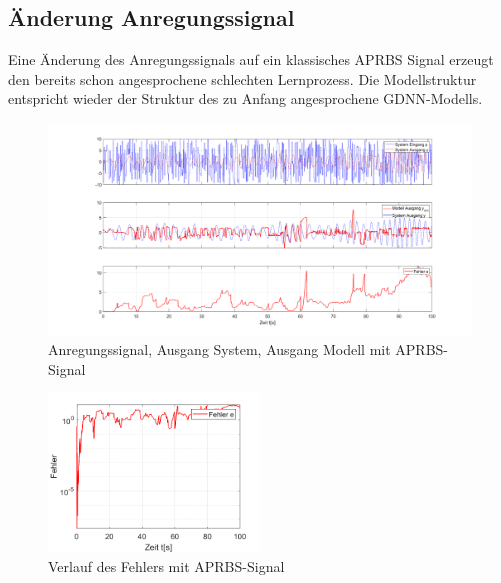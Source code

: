 \documentclass[paper=a4, fontsize=11pt]{scrartcl} %
\numberwithin{equation}{section} %
\numberwithin{figure}{section} %
\numberwithin{table}{section} %
\begin{document}
\subsection{Änderung Anregungssignal}
Eine Änderung des Anregungssignals auf ein klassisches APRBS Signal erzeugt den bereits schon angesprochene schlechten Lernprozess. Die Modellstruktur entspricht wieder der Struktur des zu Anfang angesprochene GDNN-Modells.
\begin{figure}[!h]
	\centering
		\includegraphics[width=1.00\textwidth]{./APRBS_GDNN.png}
	\caption{Anregungssignal, Ausgang System, Ausgang Modell mit APRBS-Signal}
	\label{fig:APRBS}
\end{figure}

\begin{figure}[!h]
	\centering
		\includegraphics[width=0.5\textwidth]{./APRBS_GDNN_2.png}
	\caption{Verlauf des Fehlers mit APRBS-Signal}
	\label{fig:APRBS2}
\end{figure}
\newpage
\end{document}

